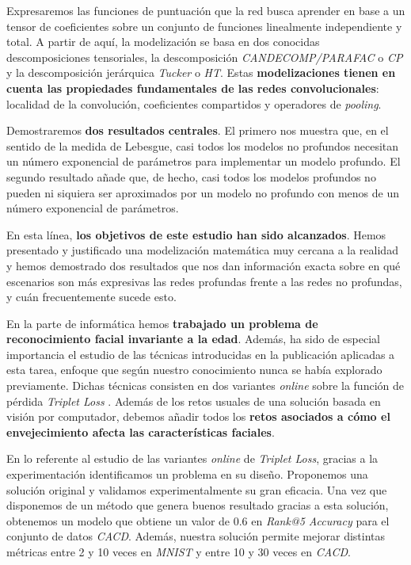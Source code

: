 Expresaremos las funciones de puntuación que la red busca aprender en base a un tensor de coeficientes sobre un conjunto de funciones linealmente independiente y total. A partir de aquí, la modelización se basa en dos conocidas descomposiciones tensoriales, la descomposición \textit{CANDECOMP/PARAFAC} o \textit{CP} y la descomposición jerárquica \textit{Tucker} o \textit{HT}. Estas \textbf{modelizaciones tienen en cuenta las propiedades fundamentales de las redes convolucionales}: localidad de la convolución, coeficientes compartidos y operadores de \textit{pooling}.

Demostraremos \textbf{dos resultados centrales}. El primero nos muestra que, en el sentido de la medida de Lebesgue, casi todos los modelos no profundos necesitan un número exponencial de parámetros para implementar un modelo profundo. El segundo resultado añade que, de hecho, casi todos los modelos profundos no pueden ni siquiera ser aproximados por un modelo no profundo con menos de un número exponencial de parámetros.

En esta línea, \textbf{los objetivos de este estudio han sido alcanzados}. Hemos presentado y justificado una modelización matemática muy cercana a la realidad y hemos demostrado dos resultados que nos dan información exacta sobre en qué escenarios son más expresivas las redes profundas frente a las redes no profundas, y cuán frecuentemente sucede esto.

En la parte de informática hemos \textbf{trabajado un problema de reconocimiento facial invariante a la edad}. Además, ha sido de especial importancia el estudio de las técnicas introducidas en la publicación \cite{informatica:principal} aplicadas a esta tarea, enfoque que según nuestro conocimiento nunca se había explorado previamente. Dichas técnicas consisten en dos variantes \textit{online} sobre la función de pérdida \textit{Triplet Loss} \cite{informatica:principal}.  Además de los retos usuales de una solución basada en visión por computador, debemos añadir todos los \textbf{retos asociados a cómo el envejecimiento afecta las características faciales}.

En lo referente al estudio de las variantes \textit{online} de \textit{Triplet Loss}, gracias a la experimentación identificamos un problema en su diseño. Proponemos una solución original y validamos experimentalmente su gran eficacia. Una vez que disponemos de un método que genera buenos resultado gracias a esta solución, obtenemos un modelo que obtiene un valor de 0.6 en \textit{Rank@5 Accuracy} para el conjunto de datos \textit{CACD}. Además, nuestra solución permite mejorar distintas métricas entre 2 y 10 veces en \textit{MNIST} y entre 10 y 30 veces en \textit{CACD}.

